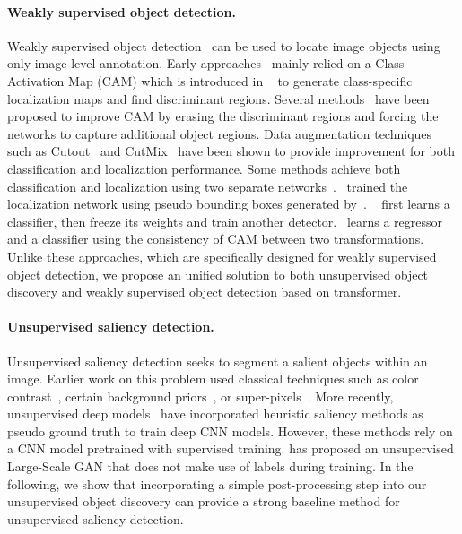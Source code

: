 \documentclass[twocolumn]{article}
\begin{document}
\paragraph{Weakly supervised object detection.} Weakly supervised object detection~\cite{yuan2019marginalized,YuanyuanICCV2017,guo2021strengthen,zhang2021weakly} can be used to locate image objects using only  image-level annotation. Early approaches~\cite{zhou2016learning,selvaraju2017grad,chattopadhay2018grad} mainly relied on a Class Activation Map (CAM) which is introduced in ~\cite{zhou2016learning} to generate class-specific localization maps and find discriminant regions. Several  methods~\cite{choe2019attention,singh2017hide,mai2020erasing,zhang2018adversarial,yuan2019marginalized, choe2020evaluating} have been proposed to improve CAM by erasing the discriminant regions  and forcing the networks to capture additional object regions. Data augmentation techniques such as Cutout~\cite{devries2017cutout} and CutMix~\cite{yun2019cutmix} have been shown to provide improvement for both classification and localization performance. Some methods achieve both classification and localization using two separate networks~\cite{zhang2020rethinking,lu2020geometry,guo2021strengthen}.~\cite{zhang2020rethinking} trained the localization network using pseudo bounding boxes generated by~\cite{wei2019unsupervised}. ~\cite{zhang2020rethinking} first learns a classifier, then freeze its
weights and train another detector.~\cite{guo2021strengthen} learns a regressor and a classifier using the consistency of CAM between two transformations. Unlike these approaches, which are specifically designed for weakly supervised object detection, we propose an unified solution to both unsupervised object discovery and weakly supervised object detection based on transformer. 

\paragraph{Unsupervised saliency detection.}
Unsupervised saliency detection seeks to segment a salient objects within an image. Earlier work on this problem \cite{yan2013hierarchical, zhu2014saliency, jiang2013salient, li2015weighted} used classical techniques such as color contrast~\cite{cheng2014global},  certain background priors~\cite{wei2012geodesic}, or super-pixels~\cite{li2015weighted, yang2013saliency}. 
More recently,  unsupervised deep models~\cite{wang2017learning, zhang2018deep, nguyen2019deepusps} have  incorporated  heuristic saliency methods as pseudo ground truth to train deep CNN models. However, these methods rely on a CNN model pretrained with supervised training.  \cite{voynov2021object} has proposed an unsupervised Large-Scale GAN that does not make use of labels during training. In the following, we show that incorporating a simple post-processing step into our unsupervised object discovery can provide a strong baseline method for unsupervised saliency detection.
\end{document}
